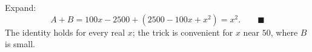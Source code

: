 Expand:
\[A+B=100x-2500+\left(2500-100x+x^2\right)=x^2.\qquad\blacksquare\]
The identity holds for every real $x$; the trick is convenient for $x$ near $50$, where $B$ is small.
